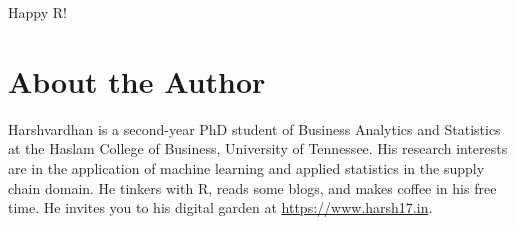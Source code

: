 \documentclass[
  letterpaper,
  DIV=11,
  numbers=noendperiod]{scrartcl}
\begin{document}
Happy R!

\hypertarget{about-the-author}{%
\section{About the Author}\label{about-the-author}}

Harshvardhan is a second-year PhD student of Business Analytics and
Statistics at the Haslam College of Business, University of Tennessee.
His research interests are in the application of machine learning and
applied statistics in the supply chain domain. He tinkers with R, reads
some blogs, and makes coffee in his free time. He invites you to his
digital garden at \url{https://www.harsh17.in}.
\end{document}
